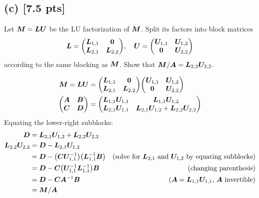 \documentclass[twoside,10pt]{article}
\begin{document}
\subsection*{(c) [7.5 pts]}
  Let $\bm{M} = \bm{L} \bm{U}$ be the LU factorization of $\bm{M}$. 
  Split its factors into block matrices 
  \begin{equation} 
    \mtx{L} = 
    \begin{pmatrix}
      \mtx{L}_{1, 1} & \mtx{0} \\
      \mtx{L}_{2, 1} & \mtx{L}_{2, 2}
    \end{pmatrix},
    \quad 
    \mtx{U} = 
    \begin{pmatrix}
      \mtx{U}_{1, 1} & \mtx{U}_{1, 2} \\
      \mtx{0} & \mtx{U}_{2, 2}
    \end{pmatrix}
  \end{equation}
  according to the same blocking as $\bm{M}$.
  Show that $\bm{M} / \bm{A} = \bm{L}_{2, 2} \bm{U}_{2, 2}$. 

  \begin{align*}
    \mtx{M}=\mtx{L}\mtx{U}&= \begin{pmatrix}
    \mtx{L}_{1,1} & \mtx{0} \\
    \mtx{L}_{2,1} & \mtx{L}_{2,2}
  \end{pmatrix}
  \begin{pmatrix}
    \mtx{U}_{1,1} & \mtx{U}_{1,2} \\
    \mtx{0} & \mtx{U}_{2,2}
  \end{pmatrix}\\
  \begin{pmatrix}
    \mtx{A} & \mtx{B}\\
    \mtx{C} & \mtx{D}
  \end{pmatrix} &= \begin{pmatrix}
      \mtx{L}_{1,1}\mtx{U}_{1,1} & \mtx{L}_{1,1}\mtx{U}_{1,2} \\
      \mtx{L}_{2,1}\mtx{U}_{1,1} & \mtx{L}_{2,1}\mtx{U}_{1,2}+\mtx{L}_{2,2}\mtx{U}_{2,2}
    \end{pmatrix}
  \end{align*}
  Equating the lower-right subblocks:
  \begin{align*}
    \mtx{D} &= \mtx{L}_{2,1}\mtx{U}_{1,2}+\mtx{L}_{2,2}\mtx{U}_{2,2}\\
    \mtx{L}_{2,2}\mtx{U}_{2,2} &= \mtx{D} - \mtx{L}_{2,1}\mtx{U}_{1,2}\\
    &= \mtx{D} - \left(\mtx{C}\mtx{U}_{1,1}^{-1}\right)\left(\mtx{L}_{1,1}^{-1}\mtx{B}\right)&\text{(solve for $ \mtx{L}_{2,1}$ and $\mtx{U}_{1,2}$ by equating subblocks)}\\
    &= \mtx{D} -\mtx{C}\left(\mtx{U}_{1,1}^{-1}\mtx{L}_{1,1}^{-1}\right)\mtx{B}&\text{(changing parenthesis)}\\
    &= \mtx{D} - \mtx{C} \mtx{A}^{-1} \mtx{B}&\text{($\mtx{A} = \mtx{L}_{1,1}\mtx{U}_{1,1}$, $\mtx{A}$ invertible)}\\
    &= \mtx{M} / \mtx{A}
  \end{align*}
\end{document}
